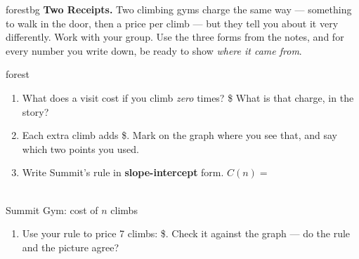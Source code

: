 \documentclass[10pt]{article}
\newcommand{\gymgrid}{%
  \draw[xstep=1, ystep=3, linegray!40, very thin] (0,0) grid (8,30);
  \draw[->, semithick, charcoal] (0,0)--(8.7,0) node[right, font=\scriptsize]{$n$};
  \draw[->, semithick, charcoal] (0,0)--(0,32) node[above, font=\scriptsize]{$C$ (\$)};
  \foreach \x in {2,4,6,8} \node[charcoal, font=\tiny, below] at (\x,0){\x};
  \foreach \y in {6,12,18,24,30} \node[charcoal, font=\tiny, left] at (0,\y){\y};}
\begin{document}

\vspace{0.08in}

\begin{headlinebox}{forestbg}
\small\textbf{Two Receipts.} Two climbing gyms charge the same way --- something to walk in the door,
then a price per climb --- but they tell you about it very differently. Work with your group. Use the
three forms from the notes, and for every number you write down, be ready to show \emph{where it came
from}.
\end{headlinebox}

\vspace{0.06in}

\begin{scenariobox}{forest}
\begin{minipage}[t]{0.56\linewidth}
\vspace{0pt}
\begin{enumerate}[label=\textbf{\alph*.}, leftmargin=1.8em, itemsep=5pt]
  \item What does a visit cost if you climb \emph{zero} times? \$ \;
        What is that charge, in the story? 
  \item Each extra climb adds \$. Mark on the graph where you see that, and say
        which two points you used.
  \item Write Summit's rule in \textbf{slope-intercept} form. \; $C(n) = $ 
\end{enumerate}
\end{minipage}\hfill
\begin{minipage}[t]{0.40\linewidth}
\vspace{0pt}\centering
{}\\[1pt]
{\footnotesize Summit Gym: cost of $n$ climbs}
\end{minipage}

\begin{enumerate}[label=\textbf{\alph*.}, start=4, leftmargin=1.8em, itemsep=5pt]
  \item Use your rule to price 7 climbs: \$. Check it against the graph --- do the
        rule and the picture agree? 
\end{enumerate}
\end{scenariobox}
\end{document}
